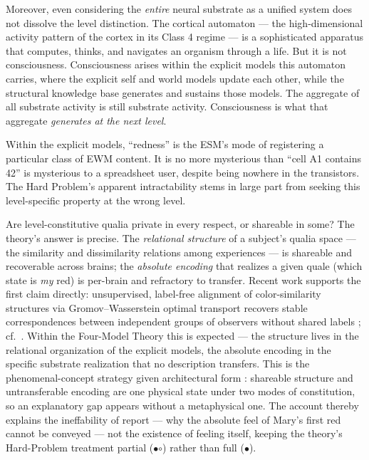 \documentclass[12pt]{article}
\begin{document}
Moreover, even considering the \emph{entire} neural substrate as a unified system does not dissolve the level distinction. The cortical automaton --- the high-dimensional activity pattern of the cortex in its Class 4 regime --- is a sophisticated apparatus that computes, thinks, and navigates an organism through a life. But it is not consciousness. Consciousness arises within the explicit models this automaton carries, where the explicit self and world models update each other, while the structural knowledge base generates and sustains those models. The aggregate of all substrate activity is still substrate activity. Consciousness is what that aggregate \emph{generates at the next level}.

Within the explicit models, ``redness'' is the ESM's mode of registering a particular class of EWM content. It is no more mysterious than ``cell A1 contains 42'' is mysterious to a spreadsheet user, despite being nowhere in the transistors. The Hard Problem's apparent intractability stems in large part from seeking this level-specific property at the wrong level.

Are level-constitutive qualia private in every respect, or shareable in some? The theory's answer is precise. The \emph{relational structure} of a subject's qualia space --- the similarity and dissimilarity relations among experiences --- is shareable and recoverable across brains; the \emph{absolute encoding} that realizes a given quale (which state is \emph{my} red) is per-brain and refractory to transfer. Recent work supports the first claim directly: unsupervised, label-free alignment of color-similarity structures via Gromov--Wasserstein optimal transport recovers stable correspondences between independent groups of observers without shared labels \citep{Kawakita2025}; cf.\ \citet{Kriegeskorte2008}. Within the Four-Model Theory this is expected --- the structure lives in the relational organization of the explicit models, the absolute encoding in the specific substrate realization that no description transfers. This is the phenomenal-concept strategy given architectural form \citep{Loar1997}: shareable structure and untransferable encoding are one physical state under two modes of constitution, so an explanatory gap appears without a metaphysical one. The account thereby explains the ineffability of report --- why the absolute feel of Mary's first red cannot be conveyed \citep{Jackson1982} --- not the existence of feeling itself, keeping the theory's Hard-Problem treatment partial ({\large$\bullet$\hspace{-8.5pt}$\circ$}) rather than full ($\bullet$).
\end{document}
